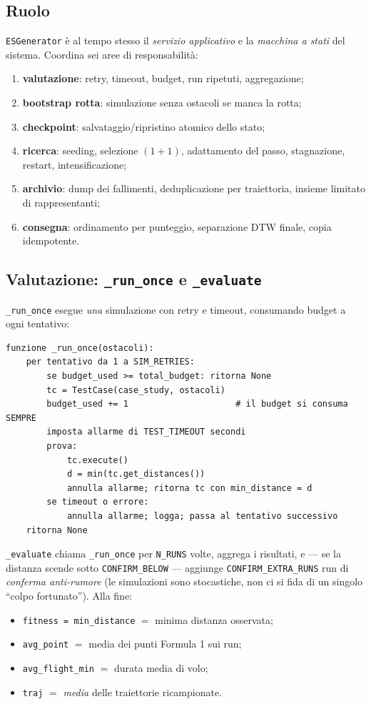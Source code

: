 \documentclass[11pt,a4paper]{report}
\newcommand{\code}[1]{\texttt{#1}}
\begin{document}
\subsection{Ruolo}
\code{ESGenerator} è al tempo stesso il \emph{servizio applicativo} e la
\emph{macchina a stati} del sistema. Coordina sei aree di
responsabilità:
\begin{enumerate}
  \item \textbf{valutazione}: retry, timeout, budget, run ripetuti,
        aggregazione;
  \item \textbf{bootstrap rotta}: simulazione senza ostacoli se manca la
        rotta;
  \item \textbf{checkpoint}: salvataggio/ripristino atomico dello stato;
  \item \textbf{ricerca}: seeding, selezione $(1+1)$, adattamento del
        passo, stagnazione, restart, intensificazione;
  \item \textbf{archivio}: dump dei fallimenti, deduplicazione per
        traiettoria, insieme limitato di rappresentanti;
  \item \textbf{consegna}: ordinamento per punteggio, separazione DTW
        finale, copia idempotente.
\end{enumerate}

\subsection{Valutazione: \texttt{\_run\_once} e \texttt{\_evaluate}}
\code{\_run\_once} esegue \emph{una} simulazione con retry e timeout,
consumando budget a ogni tentativo:
\begin{lstlisting}[style=pseudo]
funzione _run_once(ostacoli):
    per tentativo da 1 a SIM_RETRIES:
        se budget_used >= total_budget: ritorna None
        tc = TestCase(case_study, ostacoli)
        budget_used += 1                     # il budget si consuma SEMPRE
        imposta allarme di TEST_TIMEOUT secondi
        prova:
            tc.execute()
            d = min(tc.get_distances())
            annulla allarme; ritorna tc con min_distance = d
        se timeout o errore:
            annulla allarme; logga; passa al tentativo successivo
    ritorna None
\end{lstlisting}
\code{\_evaluate} chiama \code{\_run\_once} per \code{N\_RUNS} volte,
aggrega i risultati, e --- se la distanza scende sotto
\code{CONFIRM\_BELOW} --- aggiunge \code{CONFIRM\_EXTRA\_RUNS} run di
\emph{conferma anti-rumore} (le simulazioni sono stocastiche, non ci si
fida di un singolo ``colpo fortunato''). Alla fine:
\begin{itemize}
  \item \code{fitness = min\_distance} $=$ minima distanza osservata;
  \item \code{avg\_point} $=$ media dei punti Formula 1 sui run;
  \item \code{avg\_flight\_min} $=$ durata media di volo;
  \item \code{traj} $=$ \emph{media} delle traiettorie ricampionate.
\end{itemize}
\end{document}

